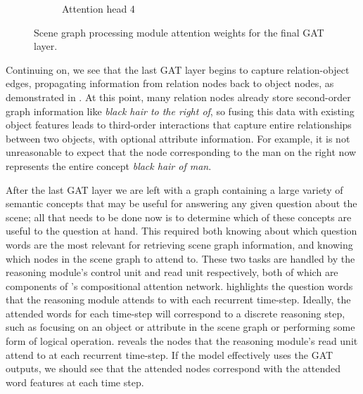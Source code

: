 \begin{figure}[htbp]
\begin{subfigure}[r]{0.49\textwidth}
        \caption{Attention head 4}
    \end{subfigure}
    \caption[GAT final layer attention weights.]{Scene graph processing module attention weights for the final GAT layer.}
    \label{fig:positive_logical_gat_l2}
\end{figure}

Continuing on, we see that the last GAT layer begins to capture relation-object edges, propagating information from relation nodes back to object nodes, as demonstrated in \figureautorefname{ \ref{fig:positive_logical_gat_l2}}. At this point, many relation nodes already store second-order graph information like \textit{black hair to the right of}, so fusing this data with existing object features leads to third-order interactions that capture entire relationships between two objects, with optional attribute information. For example, it is not unreasonable to expect that the node corresponding to the man on the right now represents the entire concept \textit{black hair of man}.

After the last GAT layer we are left with a graph containing a large variety of semantic concepts that may be useful for answering any given question about the scene; all that needs to be done now is to determine which of these concepts are useful to the question at hand. This required both knowing about which question words are the most relevant for retrieving scene graph information, and knowing which nodes in the scene graph to attend to. These two tasks are handled by the reasoning module's control unit and read unit respectively, both of which are components of \citeauthor{hudson2018compositional}'s compositional attention network. \figureautorefname{ \ref{fig:positive_logical_control_attn}} highlights the question words that the reasoning module attends to with each recurrent time-step. Ideally, the attended words for each time-step will correspond to a discrete reasoning step, such as focusing on an object or attribute in the scene graph or performing some form of logical operation. \figureautorefname{ \ref{positive_logical_read_attn}} reveals the nodes that the reasoning module's read unit attend to at each recurrent time-step. If the model effectively uses the GAT outputs, we should see that the attended nodes correspond with the attended word features at each time step.

